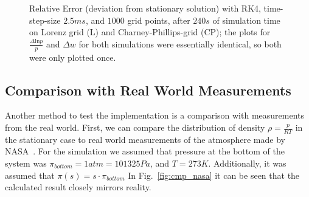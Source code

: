 \begin{figure}[!h]
    \caption{Relative Error (deviation from stationary solution) with RK4, time-step-size $2.5ms$, and $1000$ grid points, after $240s$ of simulation time on Lorenz grid (L) and Charney-Phillips-grid (CP);
    the plots for $\frac{\Delta \text{ln}p}{p}$ and $\Delta w$ for both simulations were essentially identical, so both were only plotted once.}

    \label{fig:lorenz_stat_err}
    
\end{figure}

\subsection{Comparison with Real World Measurements}
Another method to test the implementation is a comparison with measurements from the real world.
First, we can compare the distribution of density $\rho=\frac{p}{RT}$ in the stationary case to real world measurements of the atmosphere made by NASA~\cite{larson1963stratosphere}.
For the simulation we assumed that pressure at the bottom of the system was $\pi_{bottom}=1atm=101325 Pa$, and $T=273K$.
Additionally, it was assumed that $\pi (s) = s\cdot\pi_{bottom}$
In Fig.~\ref{fig:cmp_nasa} it can be seen that the calculated result closely mirrors reality.


